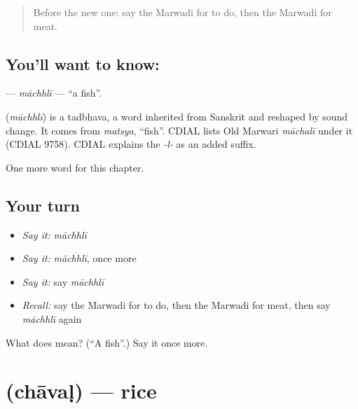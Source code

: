 \label{lesson:MW-C58-machhli}



\begin{quote}
Before the new one: say the Marwadi for to do, then the Marwadi for meat.
\end{quote}

\subsection*{You'll want to know: }
\textbf{} — \emph{māchhlī} — \textquotedblleft{}a fish\textquotedblright{}.

\begin{cousinweb}
\textbf{} (\emph{māchhlī}) is a tadbhava, a word inherited from Sanskrit and reshaped by sound change. It comes from \emph{matsya}, \textquotedblleft{}fish\textquotedblright{}. CDIAL lists Old Marwari \emph{māchalī} under it (CDIAL 9758). CDIAL explains the \emph{-l-} as an added suffix.
\end{cousinweb}

\begin{grammarlens}[title={What you've built}]
One more word for this chapter.
\end{grammarlens}

\subsection*{Your turn}
\begin{itemize}
\raggedright
  \item \emph{Say it:} \emph{māchhlī}
  \item \emph{Say it:} \emph{māchhlī}, once more
  \item \emph{Say it:} say \emph{māchhlī}
  \item \emph{Recall:} say the Marwadi for to do, then the Marwadi for meat, then say \emph{māchhlī} again
\end{itemize}

\begin{tcolorbox}[breakable,colback=teal!4,colframe=teal!35!black,title={Before you move on}]
What does  mean? (\textquotedblleft{}A fish\textquotedblright{}.) Say it once more.
\end{tcolorbox}
\section[\texorpdfstring{\mw{चावळ} (chāvaḷ)}{चावळ (chāvaḷ)}]{ (chāvaḷ) — rice}

